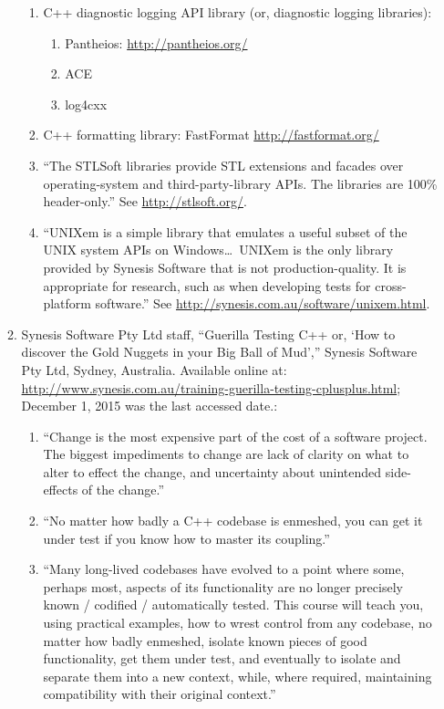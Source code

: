 \begin{enumerate}
\begin{enumerate}
\begin{enumerate}
		\item C++ diagnostic logging API library (or, diagnostic logging libraries): \vspace{-0.1cm}
			\begin{enumerate} \itemsep -1pt
			\item Pantheios: \url{http://pantheios.org/}
			\item ACE
			\item log4cxx
			\end{enumerate}
		\item C++ formatting library: FastFormat \url{http://fastformat.org/}
		\item ``The STLSoft libraries provide STL extensions and facades over operating-system and third-party-library APIs. The libraries are 100\% header-only.'' See \url{http://stlsoft.org/}.
		\item ``UNIXem is a simple library that emulates a useful subset of the UNIX system APIs on Windows\dots\ UNIXem is the only library provided by Synesis Software that is not production-quality. It is appropriate for research, such as when developing tests for cross-platform software.'' See \url{http://synesis.com.au/software/unixem.html}.
		\end{enumerate}
	\item Synesis Software Pty Ltd staff, ``Guerilla Testing C++ or, `How to discover the Gold Nuggets in your Big Ball of Mud','' Synesis Software Pty Ltd, Sydney, Australia.  Available online at: \url{http://www.synesis.com.au/training-guerilla-testing-cplusplus.html}; December 1, 2015 was the last accessed date.: \vspace{-0.2cm}
		\begin{enumerate} \itemsep -2pt
		\item ``Change is the most expensive part of the cost of a software project. The biggest impediments to change are lack of clarity on what to alter to effect the change, and uncertainty about unintended side-effects of the change.''
		\item ``No matter how badly a C++ codebase is enmeshed, you can get it under test if you know how to master its coupling.''
		\item ``Many long-lived codebases have evolved to a point where some, perhaps most, aspects of its functionality are no longer precisely known / codified / automatically tested. This course will teach you, using practical examples, how to wrest control from any codebase, no matter how badly enmeshed, isolate known pieces of good functionality, get them under test, and eventually to isolate and separate them into a new context, while, where required, maintaining compatibility with their original context.''

\end{enumerate}
\end{enumerate}
\end{enumerate}
